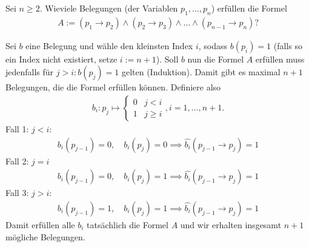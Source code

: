 
\begin{exercise}[22]

Sei $n \geq 2$.
Wieviele Belegungen (der Variablen $p_1,\dots,p_n$) erfüllen die Formel
\begin{align*}
  A := (p_1 \to p_2) \land (p_2 \to p_3) \land \dots \land (p_{n-1} \to p_n)?
\end{align*}

\end{exercise}


\begin{solution}
Sei $b$ eine Belegung und wähle den kleinsten Index $i$, sodass $b(p_i) = 1$
(falls so ein Index nicht existiert, setze $i := n + 1$).
Soll $b$ nun die Formel $A$ erfüllen muss jedenfalls für $j > i: b(p_j) = 1$ gelten (Induktion).
Damit gibt es maximal $n+1$ Belegungen, die die Formel erfüllen können.
Definiere also
\begin{align*}
  b_i: p_j \mapsto \begin{cases}
    0 & j < i \\
    1 & j \geq i
  \end{cases}, i = 1,\dots,n+1.
\end{align*}
Fall 1: $j < i:$
\begin{align*}
  b_i(p_{j-1}) = 0, \quad b_i(p_j) = 0 \implies \hat{b_i}(p_{j-1} \to p_j) = 1
\end{align*}
Fall 2: $j = i$
\begin{align*}
  b_i(p_{j-1}) = 0, \quad b_i(p_j) = 1 \implies \hat{b_i}(p_{j-1} \to p_j) = 1
\end{align*}
Fall 3: $j > i:$
\begin{align*}
  b_i(p_{j-1}) = 1, \quad b_i(p_j) = 1 \implies \hat{b_i}(p_{j-1} \to p_j) = 1
\end{align*}
Damit erfüllen alle $b_i$ tatsächlich die Formel $A$ und wir erhalten insgesamt $n+1$ mögliche Belegungen.
\end{solution}

